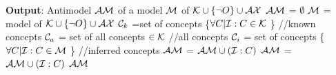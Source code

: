 \begin{algorithm}[t!]
\begin{algorithmic}[1]
%		
%		
		\EndFunction
    \end{algorithmic}
\end{algorithm}
   \begin{algorithm}[t!]
    \begin{algorithmic}[1]
			\State \textbf{Output}: Antimodel  $\mathcal{AM}$ of a model $\mathcal{M}$ of $\mathcal{K} \cup \{\neg O\} \cup \mathcal{AX}$ 
			\State $\mathcal{AM}$ = $\emptyset$
			\State $\mathcal{M}$ = model of $\mathcal{K} \cup \{\neg O\} \cup \mathcal{AX}$ 
				\State $\mathcal{C} _k$ =set of concepts \{$\forall C  | {\mathcal{I} : C} \in \mathcal{K} $ \} //known concepts   
				\State $\mathcal{C} _a$ = set of all concepts $\in \mathcal{K}$ //all concepts
				\State $\mathcal{C} _i$ = set of concepts \{$ \forall C | {\mathcal{I} : C} \in \mathcal{M} $ \} //inferred concepts
						\State $\mathcal{AM}$ = $\mathcal{AM} \cup (\mathcal{I} : C)$
					\EndIf
				\EndFor
						\State $\mathcal{AM}$ = $\mathcal{AM} \cup (\mathcal{I} : C)$
					\EndIf
				\EndFor
			\EndFor
		\State \Return $\mathcal{AM}$
 	\EndFunction
    \end{algorithmic}
\end{algorithm}